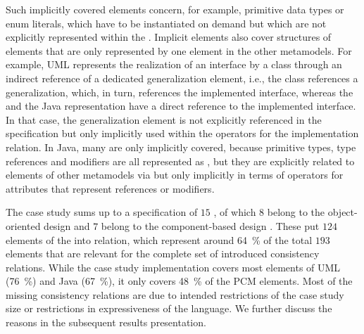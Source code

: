 Such implicitly covered elements concern, for example, primitive data types or enum literals, which have to be instantiated on demand but which are not explicitly represented within the \commonalities.
Implicit elements also cover structures of elements that are only represented by one element in the other metamodels.
For example, \gls{UML} represents the realization of an interface by a class through an indirect reference of a dedicated generalization element, i.e., the class references a generalization, which, in turn, references the implemented interface, whereas the \commonality and the Java representation have a direct reference to the implemented interface.
In that case, the generalization element is not explicitly referenced in the \commonality specification but only implicitly used within the operators for the implementation relation.
In Java, many \metaclasses are only implicitly covered, because primitive types, type references and modifiers are all represented as \metaclasses, but they are explicitly related to elements of other metamodels via \commonalities but only implicitly in terms of operators for attributes that represent references or modifiers.

The case study sums up to a specification of $15$ \commonalities, of which $8$ belong to the object-oriented design \conceptmetamodel and $7$ belong to the component-based design \conceptmetamodel.
These \commonalities put $124$ elements of the \concretemetamodels into relation, which represent around \SI{64}{\percent} of the total $193$ elements that are relevant for the complete set of introduced consistency relations.
While the case study implementation covers most elements of \gls{UML} (\SI{76}{\percent}) and Java (\SI{67}{\percent}), it only covers \SI{48}{\percent} of the \gls{PCM} elements.
Most of the missing consistency relations are due to intended restrictions of the case study size or restrictions in expressiveness of the \commonalities language.
We further discuss the reasons in the subsequent results presentation.

